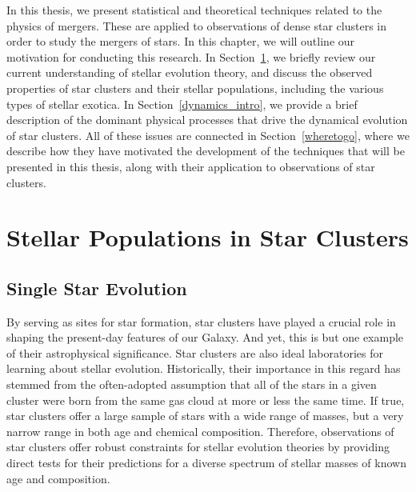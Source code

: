 In this thesis, we present statistical and theoretical techniques
related to the physics of mergers.  These are applied to observations
of dense star clusters in order to study the mergers of stars.  In
this chapter, we will outline our motivation for conducting this 
research.  In
Section~\ref{SPs}, we briefly review our current
understanding of stellar evolution theory, and discuss the observed
properties of star clusters and their stellar populations, including
the various types of stellar exotica.  In
Section~\ref{dynamics_intro}, we provide a brief description of the dominant
physical processes that drive the dynamical evolution of star
clusters.  All of these issues are connected in Section~\ref{wheretogo},
where we describe how they have motivated the development of the
techniques that will be presented in this thesis, along with their
application to observations of star clusters.

\section{Stellar Populations in Star Clusters} \label{SPs}

\subsection{Single Star Evolution} \label{standard}

By serving as sites for star formation, star clusters have played a
crucial role in shaping the present-day features of our Galaxy.  And
yet, this is but one example of their 
astrophysical significance.  Star clusters are also ideal
laboratories for learning about stellar evolution.  Historically,
their importance in this regard has stemmed from the often-adopted
assumption that all of the stars in a given cluster were born 
from the same gas cloud at more or less the same time.  If true, star
clusters offer a large sample of stars with a wide range of masses,
but a very narrow range in both age and chemical composition.
Therefore, observations of star clusters offer robust constraints for
stellar evolution theories by providing direct tests for their
predictions for a diverse spectrum of stellar masses of known age and
composition. 

